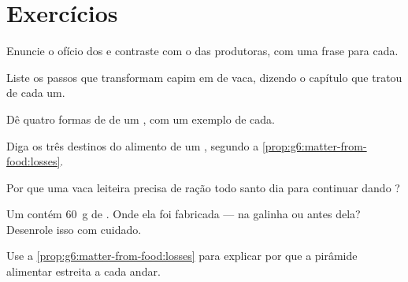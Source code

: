 \section{Exercícios}

\begin{exercise}[$\star$]\label{exo:g6:matter-from-food:1}
Enuncie o ofício dos  e contraste com o das produtoras,
com uma frase para cada.
\end{exercise}

\begin{exercise}[$\star$]\label{exo:g6:matter-from-food:2}
Liste os passos que transformam capim em  de vaca, dizendo o
capítulo que tratou de cada um.
\end{exercise}

\begin{exercise}[$\star$]\label{exo:g6:matter-from-food:3}
Dê quatro formas de  de um , com um exemplo
de cada.
\end{exercise}

\begin{exercise}[$\star$]\label{exo:g6:matter-from-food:4}
Diga os três destinos do alimento de um , segundo a
\cref{prop:g6:matter-from-food:losses}.
\end{exercise}

\begin{exercise}[$\star$]\label{exo:g6:matter-from-food:5}
Por que uma vaca leiteira precisa de ração todo santo dia para
continuar dando ?
\end{exercise}

\begin{exercise}[$\star$]\label{exo:g6:matter-from-food:6}
Um  contém \qty{60}{g} de . Onde ela foi fabricada
--- na galinha ou antes dela? Desenrole isso com cuidado.
\end{exercise}

\begin{exercise}[$\star\star$]\label{exo:g6:matter-from-food:7}
Use a \cref{prop:g6:matter-from-food:losses} para explicar por que a
pirâmide alimentar estreita a cada andar.
\end{exercise}


